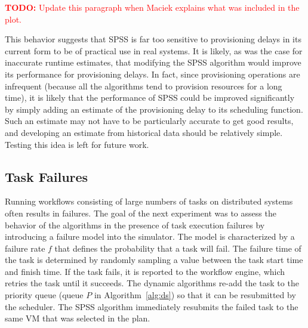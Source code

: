 \documentclass[conference]{IEEEtran}
\newcommand{\TODO}[1]{
  {\Large \textcolor{red}{\textbf{TODO: }#1}}
}
\begin{document}
\TODO{Update this paragraph when Maciek explains what was included in the plot.}

This behavior suggests that SPSS is far too sensitive to provisioning delays in its current form to be of practical use in real systems. It is likely, as was the case for inaccurate runtime estimates, that modifying the SPSS algorithm would improve its performance for provisioning delays. In fact, since provisioning operations are infrequent (because all the algorithms tend to provision resources for a long time), it is likely that the performance of SPSS could be improved significantly by simply adding an estimate of the provisioning delay to its scheduling function. Such an estimate may not have to be particularly accurate to get good results, and developing an estimate from historical data should be relatively simple. Testing this idea is left for future work.


\subsection{Task Failures}
\label{sec:failures}

Running workflows consisting of large numbers of tasks on distributed systems
often results in failures. The goal of the next experiment was
to assess the behavior of the algorithms in the presence of task execution
failures by introducing a failure model into the simulator. The model is
characterized by a failure rate $f$ that defines the probability that a task
will fail. The failure time of the task is determined by randomly sampling a
value between the task start time and finish time. If the task fails, it is reported to
the workflow engine, which retries the task until it succeeds. The dynamic algorithms
re-add the task to the priority queue (queue $P$ in Algorithm~\ref{alg:ds})
so that it can be resubmitted by the scheduler. The SPSS algorithm immediately 
resubmits the failed task to the same VM that was selected in the plan.
\end{document}
